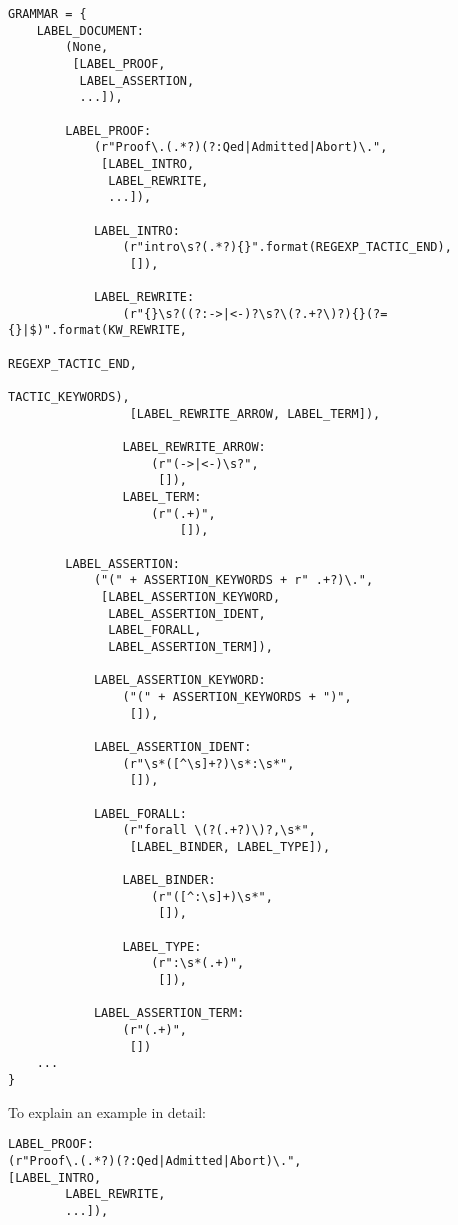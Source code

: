 \begin{lstlisting}
GRAMMAR = {
    LABEL_DOCUMENT:
        (None,
         [LABEL_PROOF,
          LABEL_ASSERTION,
          ...]),

        LABEL_PROOF:
            (r"Proof\.(.*?)(?:Qed|Admitted|Abort)\.",
             [LABEL_INTRO,
              LABEL_REWRITE,
              ...]),

            LABEL_INTRO:
                (r"intro\s?(.*?){}".format(REGEXP_TACTIC_END),
                 []),

            LABEL_REWRITE:
                (r"{}\s?((?:->|<-)?\s?\(?.+?\)?){}(?={}|$)".format(KW_REWRITE,
                                                                   REGEXP_TACTIC_END,
                                                                   TACTIC_KEYWORDS),
                 [LABEL_REWRITE_ARROW, LABEL_TERM]),

                LABEL_REWRITE_ARROW:
                    (r"(->|<-)\s?",
                     []),
                LABEL_TERM:
                    (r"(.+)",
                        []),

        LABEL_ASSERTION:
            ("(" + ASSERTION_KEYWORDS + r" .+?)\.",
             [LABEL_ASSERTION_KEYWORD,
              LABEL_ASSERTION_IDENT,
              LABEL_FORALL,
              LABEL_ASSERTION_TERM]),

            LABEL_ASSERTION_KEYWORD:
                ("(" + ASSERTION_KEYWORDS + ")",
                 []),

            LABEL_ASSERTION_IDENT:
                (r"\s*([^\s]+?)\s*:\s*",
                 []),

            LABEL_FORALL:
                (r"forall \(?(.+?)\)?,\s*",
                 [LABEL_BINDER, LABEL_TYPE]),

                LABEL_BINDER:
                    (r"([^:\s]+)\s*",
                     []),

                LABEL_TYPE:
                    (r":\s*(.+)",
                     []),

            LABEL_ASSERTION_TERM:
                (r"(.+)",
                 [])
    ...
}
\end{lstlisting}

To explain an example in detail:
\begin{lstlisting}
LABEL_PROOF:
(r"Proof\.(.*?)(?:Qed|Admitted|Abort)\.",
[LABEL_INTRO,
        LABEL_REWRITE,
        ...]),
\end{lstlisting}


